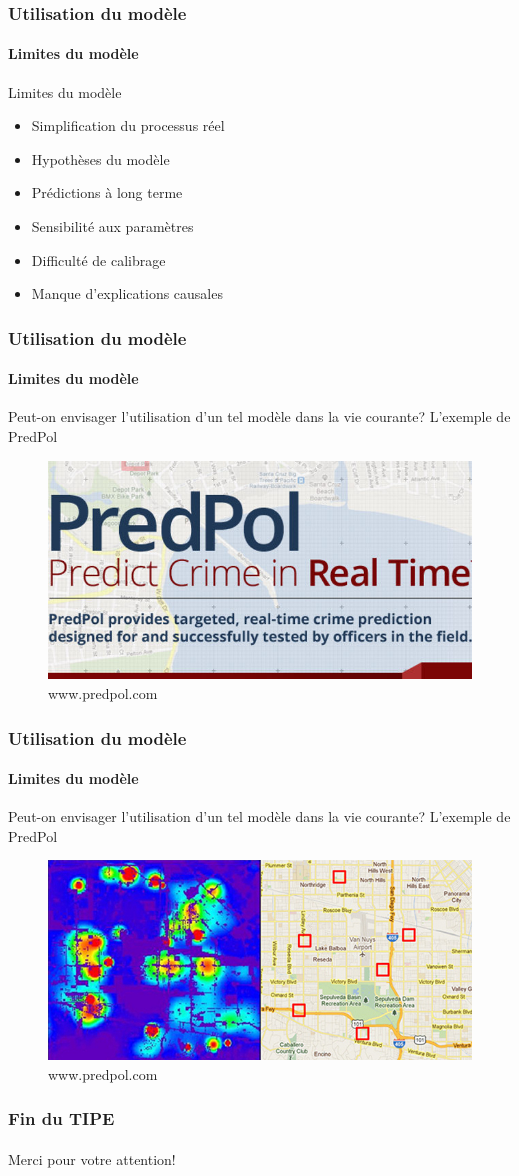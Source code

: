 \begin{frame}
    \frametitle{Utilisation du modèle}
    \framesubtitle{Limites du modèle}
    \begin{block}{Limites du modèle}
        \begin{itemize}
            \item Simplification du processus réel
            \item Hypothèses du modèle
            \item Prédictions à long terme
            \item Sensibilité aux paramètres
            \item Difficulté de calibrage
            \item Manque d'explications causales 
        \end{itemize}
    \end{block}    
\end{frame}


\begin{frame}
    \frametitle{Utilisation du modèle}
    \framesubtitle{Limites du modèle}
    \begin{alertblock}{Peut-on envisager l'utilisation d'un tel modèle dans la vie courante? L'exemple de PredPol}
        \begin{figure}
            \centering
            \includegraphics[width=0.6\linewidth]{figures/CorteX_predpol_slogan.jpg}
            \caption{www.predpol.com}
        \end{figure}
    \end{alertblock}
\end{frame}

\begin{frame}
    \frametitle{Utilisation du modèle}
    \framesubtitle{Limites du modèle}
    \begin{alertblock}{Peut-on envisager l'utilisation d'un tel modèle dans la vie courante? L'exemple de PredPol}
        \begin{figure}
            \centering
            \includegraphics[width=0.6\linewidth]{figures/i_predpol.jpg}
            \caption{www.predpol.com}
        \end{figure}
    \end{alertblock}
\end{frame}

\begin{frame}
    \frametitle{Fin du TIPE}
    \framesubtitle{}
        \centering
        \Large{Merci pour votre attention!}
\end{frame}



